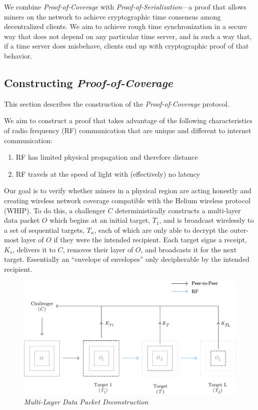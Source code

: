 \documentclass[10pt, nonatbib, nocopyrightspace, reprint]{sigplanconf}
\begin{document}
We combine \emph{Proof-of-Coverage} with \emph{Proof-of-Serialization}---a proof that allows miners on the network to achieve cryptographic time consensus among decentralized clients. We aim to achieve rough time synchronization in a secure way that does not depend on any particular time server, and in such a way that, if a time server does misbehave, clients end up with cryptographic proof of that behavior.

\subsection{Constructing \emph{Proof-of-Coverage}}

This section describes the construction of the \emph{Proof-of-Coverage} protocol.

We aim to construct a proof that takes advantage of the following characteristics of radio frequency (RF) communication that are unique and different to internet communication:

\begin{enumerate}
    \item RF has limited physical propagation and therefore distance
    \item RF travels at the speed of light with (effectively) no latency
\end{enumerate}

Our goal is to verify whether miners in a physical region are acting honestly and creating wireless network coverage compatible with the Helium wireless protocol (WHIP). To do this, a challenger $C$ deterministically constructs a multi-layer data packet $O$ which begins at an initial target, $T_1$, and is broadcast wirelessly to a set of sequential targets, $T_n$, each of which are only able to decrypt the outer-most layer of $O$ if they were the intended recipient. Each target signs a receipt, $K_s$, delivers it to $C$, removes their layer of $O$, and broadcasts it for the next target. Essentially an ``envelope of envelopes'' only decipherable by the intended recipient.

\begin{figure}[ht]
    \begin{center}
          \includegraphics[width=\columnwidth]{deconstruction.eps}
          \caption{\emph{Multi-Layer Data Packet Deconstruction}}
          \label{fig:poc-deconstruction}
     \end{center}
\end{figure}
\end{document}
